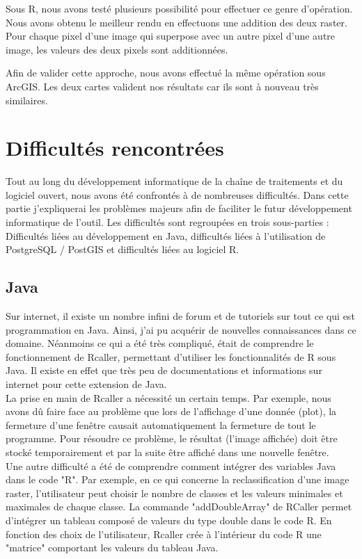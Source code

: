 Sous R, nous avons testé plusieurs possibilité pour effectuer ce genre d'opération. Nous avons obtenu le meilleur rendu en effectuons une addition des deux raster. Pour chaque pixel d'une image qui superpose avec un autre pixel d'une autre image, les valeurs des deux pixels sont additionnées.

Afin de valider cette approche, nous avons effectué la même opération sous ArcGIS. Les deux cartes valident nos résultats car ils sont à nouveau très similaires. 

\section{Difficultés rencontrées}

Tout au long du développement informatique de la chaîne de traitements et du logiciel ouvert, nous avons été confrontés à de nombreuses difficultés. Dans cette partie j'expliquerai les problèmes majeurs afin de faciliter le futur développement informatique de l'outil. Les difficultés sont regroupées en trois sous-parties : Difficultés liées au développement en Java, difficultés liées à l'utilisation de PostgreSQL / PostGIS et difficultés liées au logiciel R.\\

\subsection{Java}

Sur internet, il existe un nombre infini de forum et de tutoriels sur tout ce qui est programmation en Java. Ainsi, j'ai pu acquérir de nouvelles connaissances dans ce domaine. Néanmoins ce qui a été très compliqué, était de comprendre le fonctionnement de Rcaller, permettant d'utiliser les fonctionnalités de R sous Java. Il existe en effet que très peu de documentations et informations sur internet pour cette extension de Java. \\
La prise en main de Rcaller a nécessité un certain temps. Par exemple, nous avons dû faire face au problème que lors de l'affichage d'une donnée (plot), la fermeture d'une fenêtre causait automatiquement la fermeture de tout le programme. Pour résoudre ce problème, le résultat (l'image affichée) doit être stocké temporairement et par la suite être affiché dans une nouvelle fenêtre. \\
Une autre difficulté a été de comprendre comment intégrer des variables Java dans le code "R". Par exemple, en ce qui concerne la reclassification d'une image raster, l'utilisateur peut choisir le nombre de classes et les valeurs minimales et maximales de chaque classe. La commande "addDoubleArray" de RCaller permet d'intégrer un tableau composé de valeurs du type double dans le code R. En fonction des choix de l'utilisateur, Rcaller crée à l'intérieur du code R une "matrice" comportant les valeurs du tableau Java. \\

